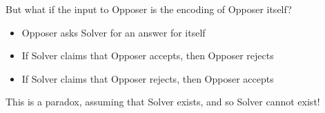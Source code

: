 But what if the input to Opposer is the encoding of Opposer itself?
\begin{itemize}
  \item Opposer asks Solver for an answer for itself
  \item If Solver claims that Opposer accepts, then Opposer rejects
  \item If Solver claims that Opposer rejects, then Opposer accepts
\end{itemize}

This is a paradox, assuming that Solver exists, and so Solver cannot exist!